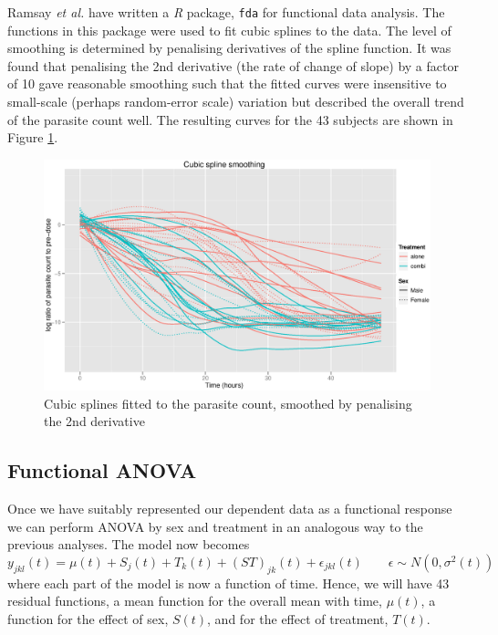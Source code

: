 Ramsay \textit{et al.} have written a \emph{R} package, \texttt{fda}\cite{fdaR, fdaRbook} for functional data analysis. The functions in this package were used to fit cubic splines to the data. The level of smoothing is determined by penalising derivatives of the spline function. It was found that penalising the 2nd derivative (the rate of change of slope) by a factor of 10 gave reasonable smoothing such that the fitted curves were insensitive to small-scale (perhaps random-error scale) variation but described the overall trend of the parasite count well. The resulting curves for the 43 subjects are shown in Figure \ref{cubicspline}.
\begin{figure}[h]
\includegraphics[width=150mm]{cubicspline.eps} 
\caption{Cubic splines fitted to the parasite count, smoothed by penalising the 2nd derivative}
\label{cubicspline}
\end{figure}

\subsection{Functional ANOVA}
Once we have suitably represented our dependent data as a functional response we can perform ANOVA by sex and treatment in an analogous way to the previous analyses. The model now becomes
\begin{equation}
y_{jkl}(t)=\mu(t)+S_{j}(t)+T_{k}(t)+(ST)_{jk}(t)+\epsilon_{jkl}(t)\quad\quad\epsilon\sim N(0, \sigma^{2}(t))\label{aovfda}
\end{equation}
where each part of the model is now a function of time. Hence, we will have 43 residual functions, a mean function for the overall mean with time, $\mu(t)$, a function for the effect of sex, $S(t)$, and for the effect of treatment, $T(t)$.

